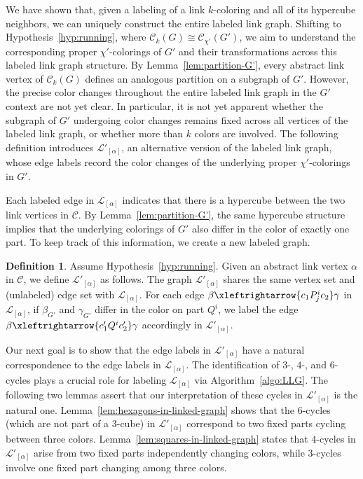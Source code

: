 \documentclass{amsart}
\theoremstyle{hypothesisstyle}
\theoremstyle{definition}
\newtheorem{definition}[theorem]{Definition}
\theoremstyle{remark}
\numberwithin{equation}{section}
\begin{document}
We have shown that, given a labeling of a link $k$-coloring and all of its hypercube neighbors, we can uniquely construct the entire labeled link graph. Shifting to Hypothesis~\ref{hyp:running}, where $\mathcal{C}_k(G)\cong\mathcal{C}_{\chi'}(G')$, we aim to understand the corresponding proper $\chi'$-colorings of $G'$ and their transformations across this labeled link graph structure. By Lemma~\ref{lem:partition-G'}, every abstract link vertex of $\mathcal{C}_k(G)$ defines an analogous partition on a subgraph of $G'$. However, the precise color changes throughout the entire labeled link graph in the $G'$ context are not yet clear. In particular, it is not yet apparent whether the subgraph of $G'$ undergoing color changes remains fixed across all vertices of the labeled link graph, or whether more than $k$ colors are involved. The following definition introduces $\mathcal{L}'_{[\alpha]}$, an alternative version of the labeled link graph, whose edge labels record the color changes of the underlying proper $\chi'$-colorings in $G'$.

Each labeled edge in $\mathcal{L}_{[\alpha]}$ indicates that there is a hypercube between the two link vertices in $\mathcal{C}$. By Lemma~\ref{lem:partition-G'}, the same hypercube structure implies that the underlying colorings of $G'$ also differ in the color of exactly one part. To keep track of this information, we create a new labeled graph.

\begin{definition}
    Assume Hypothesis~\ref{hyp:running}. Given an abstract link vertex $\alpha$ in $\mathcal{C}$, we define $\mathcal{L}'_{[\alpha]}$ as follows. The graph $\mathcal{L}'_{[\alpha]}$ shares the same vertex set and (unlabeled) edge set with $\mathcal{L}_{[\alpha]}$. For each edge $\beta\xleftrightarrow{c_1 P^i_{j}c_2} \gamma$ in $\mathcal{L}_{[\alpha]}$, if $\beta_{G'}$ and $\gamma_{G'}$ differ in the color on part $Q^{i}$, we label the edge $\beta\xleftrightarrow{c'_1 Q^{i} c'_2} \gamma$ accordingly in $\mathcal{L}'_{[\alpha]}$. 
\end{definition}

Our next goal is to show that the edge labels in $\mathcal{L}'_{[\alpha]}$ have a natural correspondence to the edge labels in $\mathcal{L}_{[\alpha]}$. The identification of $3$-, $4$-, and $6$-cycles plays a crucial role for labeling $\mathcal{L}_{[\alpha]}$ via Algorithm~\ref{algo:LLG}. The following two lemmas assert that our interpretation of these cycles in $\mathcal{L}'_{[\alpha]}$ is the natural one. Lemma~\ref{lem:hexagons-in-linked-graph} shows that the $6$-cycles (which are not part of a 3-cube) in $\mathcal{L}'_{[\alpha]}$ correspond to two fixed parts cycling between three colors. Lemma~\ref{lem:squares-in-linked-graph} states that $4$-cycles in $\mathcal{L}'_{[\alpha]}$ arise from two fixed parts independently changing colors, while $3$-cycles involve one fixed part changing among three colors.
\end{document}
